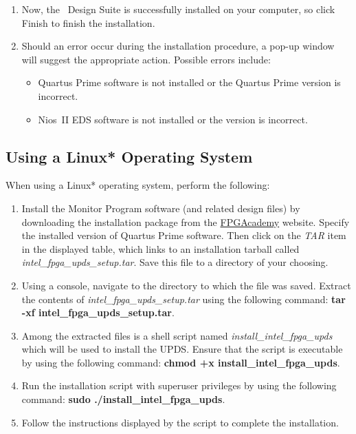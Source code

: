\documentclass[11pt, twoside, pdftex]{article}
\begin{document}
\begin{enumerate}
\item Now, the \teamname ~Design Suite is successfully installed on your computer, so click {\sf Finish} to
finish the installation.

\item Should an error occur during the installation procedure, a pop-up window will suggest the appropriate action. 
Possible errors include:
\begin{itemize}
\item Quartus Prime software is not installed or the Quartus Prime
version is incorrect.
\item Nios~II EDS software is not installed or the version is
incorrect.
\end{itemize}
\end{enumerate}

\subsection{Using a Linux* Operating System}
\label{sec:2.2}

When using a Linux* operating system, perform the following:

\begin{enumerate} 
\item Install the Monitor Program software (and related design files) by downloading the 
installation package from the 
\href{https://www.fpgacademy.org/tools.html}{FPGAcademy} website.
Specify the installed version of Quartus Prime software.
Then click on the {\it TAR} item in the displayed table, 
which links to an installation tarball called 
{\it intel\_fpga\_upds\_setup.tar}. 
Save this file to a directory of your choosing.

\item Using a console, navigate to the directory to which the
file was saved. Extract the contents of 
{\it intel\_fpga\_upds\_setup.tar} using the following command: 
{\bf tar -xf intel\_fpga\_upds\_setup.tar}.

\item Among the extracted files is a shell script named
{\it install\_intel\_fpga\_upds} which will be used to install the
UPDS. Ensure that the script is executable by using the following
command: {\bf chmod +x install\_intel\_fpga\_upds}. 

\item Run the installation script with superuser privileges by
using the following command: 
{\bf sudo ./install\_intel\_fpga\_upds}.

\item Follow the instructions displayed by the script to complete
the installation.

\end{enumerate}
\end{document}
